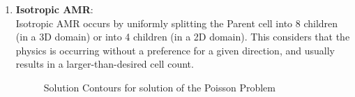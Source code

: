 \begin{enumerate}

\item \textbf{Isotropic AMR}:\\
Isotropic AMR  occurs by uniformly splitting the Parent cell into 8 children (in a 3D domain) or into 4 children (in a 2D domain). This considers that the physics is occurring without a preference for a given direction, and usually results in a larger-than-desired cell count.
\begin{figure}[t!]
  \centering
	\:
     
    \caption{Solution Contours for solution of the Poisson Problem}  
\end{figure}


\end{enumerate}
